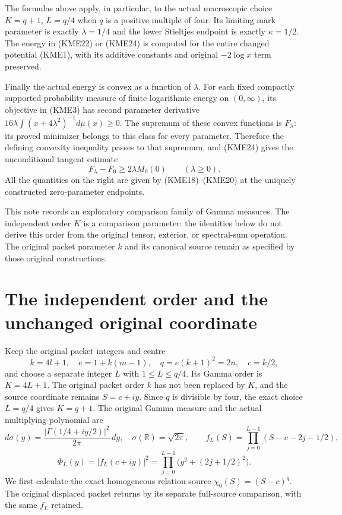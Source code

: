 \documentclass[11pt,a4paper]{article}
\newcommand{\R}{\mathbb R}
\begin{document}
The formulas above apply, in particular, to the actual macroscopic
choice $K=q+1$, $L=q/4$ when $q$ is a positive multiple of four.
Its limiting mark parameter is exactly $\lambda=1/4$ and the lower
Stieltjes endpoint is exactly $\kappa=1/2$. The energy in (KME22) or (KME24)
is computed for the entire changed potential (KME1), with its additive
constants and original $-2\log x$ term preserved.

Finally the actual energy is convex as a function of $\lambda$.
For each fixed compactly supported probability measure of finite
logarithmic energy on $(0,\infty)$,
its objective in (KME3) has second parameter derivative
$16\lambda\int(x+4\lambda^2)^{-1}d\mu(x)\geq0$.
The supremum of these convex functions is $F_\lambda$: its proved
minimizer belongs to this class for every parameter. Therefore the
defining convexity inequality passes to that supremum, and (KME24)
gives the unconditional tangent estimate
\begin{equation}\tag{KME25}
 F_\lambda-F_0\geq2\lambda M_0(0)\qquad(\lambda\geq0).
\end{equation}
All the quantities on the right are given by (KME18)--(KME20) at the
uniquely constructed zero-parameter endpoints.


\clearpage




This note records an exploratory comparison family of Gamma measures.
The independent order $K$ is a comparison parameter: the identities below
do not derive this order from the original tensor, exterior, or spectral-sum
operation. The original packet parameter $k$ and its canonical source
remain as specified by those original constructions.

\section{The independent order and the unchanged original coordinate}

Keep the original packet integers and centre
\[
 k=4l+1,\quad e=1+k(m-1),\quad q=e(k+1)^2=2n,
 \quad c=k/2,
\]
and choose a separate integer $L$ with $1\le L\le q/4$. Its Gamma
order is $K=4L+1$. The original packet order $k$ has not been replaced
by $K$, and the source coordinate remains $S=c+iy$. Since $q$ is
divisible by four, the exact choice $L=q/4$ gives $K=q+1$.
The original Gamma measure and the actual multiplying polynomial are
\[
 d\sigma(y)=\frac{|\Gamma(1/4+iy/2)|^2}{2\pi}\,dy,
 \quad \sigma(\R)=\sqrt{2\pi},\qquad
 f_L(S)=\prod_{j=0}^{L-1}(S-c-2j-1/2),
 \tag{MFG1}
\]
\[
 \Phi_L(y)=|f_L(c+iy)|^2
          =\prod_{j=0}^{L-1}\big(y^2+(2j+1/2)^2\big).
 \tag{MFG2}
\]
We first calculate the exact homogeneous relation source
$\chi_0(S)=(S-c)^q$. The original displaced packet returns by its
separate full-source comparison, with the same $f_L$ retained.
\end{document}

